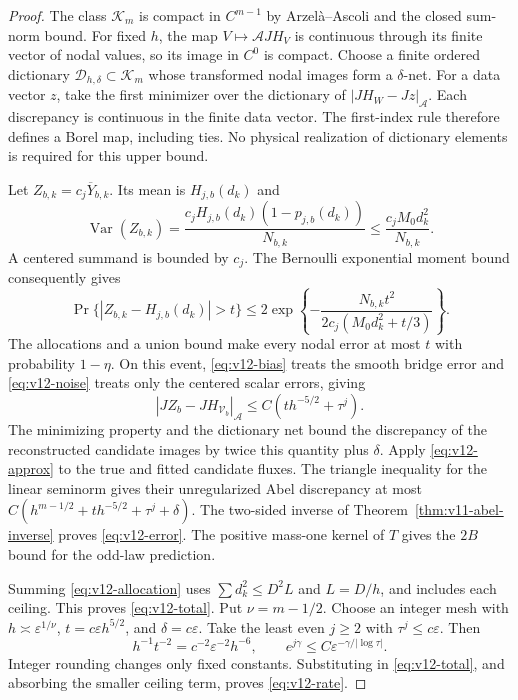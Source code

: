\begin{proof}
The class $\mathcal K_m$ is compact in $C^{m-1}$ by
Arzel\`a--Ascoli and the closed sum-norm bound. For fixed $h$, the
map $V\mapsto\mathscr A JH_V$ is continuous through its finite
vector of nodal values, so its image in $C^0$ is compact. Choose
a finite ordered dictionary $\mathcal D_{h,\delta}\subset\mathcal K_m$
whose transformed nodal images form a $\delta$-net. For a data
vector $z$, take the first minimizer over the dictionary of
$|JH_W-Jz|_{\mathscr A}$. Each discrepancy is continuous in the
finite data vector. The first-index rule therefore defines a Borel
map, including ties. No physical realization of dictionary elements
is required for this upper bound.

Let $Z_{b,k}=c_j\overline Y_{b,k}$. Its mean is
$H_{j,b}(d_k)$ and
\[
 \operatorname{Var}(Z_{b,k})
   =\frac{c_jH_{j,b}(d_k)(1-p_{j,b}(d_k))}{N_{b,k}}
                   \le\frac{c_jM_0d_k^2}{N_{b,k}}.
\]
A centered summand is bounded by $c_j$. The Bernoulli exponential
moment bound consequently gives
\[
 \Pr\{|Z_{b,k}-H_{j,b}(d_k)|>t\}
 \le2\exp\!\left\{-\frac{N_{b,k}t^2}
                            {2c_j(M_0d_k^2+t/3)}\right\}.
\]
The allocations and a union bound make every nodal error at most
$t$ with probability $1-\eta$. On this event,
\eqref{eq:v12-bias} treats the smooth bridge error and
\eqref{eq:v12-noise} treats only the centered scalar errors, giving
\[
 |JZ_b-JH_{\mathcal V_b}|_{\mathscr A}
                           \le C(t h^{-5/2}+\tau^j).
\]
The minimizing property and the dictionary net bound the discrepancy
of the reconstructed candidate images by twice this quantity plus
$\delta$. Apply \eqref{eq:v12-approx} to the true and fitted
candidate fluxes. The triangle inequality for the linear seminorm
gives their unregularized Abel discrepancy at most
$C(h^{m-1/2}+t h^{-5/2}+\tau^j+\delta)$.
The two-sided inverse of Theorem~\ref{thm:v11-abel-inverse}
proves \eqref{eq:v12-error}. The positive mass-one kernel of $T$
gives the $2B$ bound for the odd-law prediction.

Summing \eqref{eq:v12-allocation} uses
$\sum d_k^2\le D^2L$ and $L=D/h$, and includes each ceiling.
This proves \eqref{eq:v12-total}. Put $\nu=m-1/2$.
Choose an integer mesh with $h\asymp\varepsilon^{1/\nu}$,
$t=c\varepsilon h^{5/2}$, and $\delta=c\varepsilon$.
Take the least even $j\ge2$ with $\tau^j\le c\varepsilon$.
Then
\[
 h^{-1}t^{-2}=c^{-2}\varepsilon^{-2}h^{-6},\qquad
 e^{j\gamma}\le C\varepsilon^{-\gamma/|\log\tau|}.
\]
Integer rounding changes only fixed constants. Substituting in
\eqref{eq:v12-total}, and absorbing the smaller ceiling term,
proves \eqref{eq:v12-rate}.
\end{proof}

